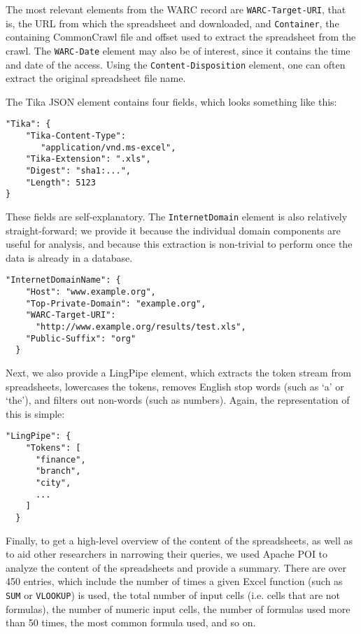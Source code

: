 \documentclass[conference]{IEEEtran}
\begin{document}
The most relevant elements from the WARC record are \texttt{WARC-Target-URI}, that is, the URL from which the spreadsheet and downloaded, and \texttt{Container}, the containing CommonCrawl file and offset used to extract the spreadsheet from the crawl. The \texttt{WARC-Date} element may also be of interest, since it contains the time and date of the access. Using the \texttt{Content-Disposition} element, one can often extract the original spreadsheet file name.

The Tika JSON element contains four fields, which looks something like this:

\begin{lstlisting}
"Tika": {
    "Tika-Content-Type": 
       "application/vnd.ms-excel",
    "Tika-Extension": ".xls",
    "Digest": "sha1:...",
    "Length": 5123
}
\end{lstlisting}

These fields are self-explanatory. The \texttt{InternetDomain} element is also relatively straight-forward; we provide it because the individual domain components are useful for analysis, and because this extraction is non-trivial to perform once the data is already in a database.

\begin{lstlisting}
"InternetDomainName": {
    "Host": "www.example.org",    
    "Top-Private-Domain": "example.org",
    "WARC-Target-URI": 
      "http://www.example.org/results/test.xls",
    "Public-Suffix": "org"
  }
\end{lstlisting}

Next, we also provide a LingPipe element, which extracts the token stream from spreadsheets, lowercases the tokens, removes English stop words (such as `a' or `the'), and filters out non-words (such as numbers). Again, the representation of this is simple:

\begin{lstlisting}
"LingPipe": {    
    "Tokens": [
      "finance",
      "branch",      
      "city",
      ...
    ]
  }
\end{lstlisting}

Finally, to get a high-level overview of the content of the spreadsheets, as well as to aid other researchers in narrowing their queries, we used Apache POI  to analyze the content of the spreadsheets and provide a summary. 
There are over 450 entries, which include the number of times a given Excel function (such as \texttt{SUM} or \texttt{VLOOKUP}) is used, the total number of input cells (i.e. cells that are not formulas), the number of numeric input cells, the number of formulas used more than 50 times, the most common formula used, and so on.
\end{document}
